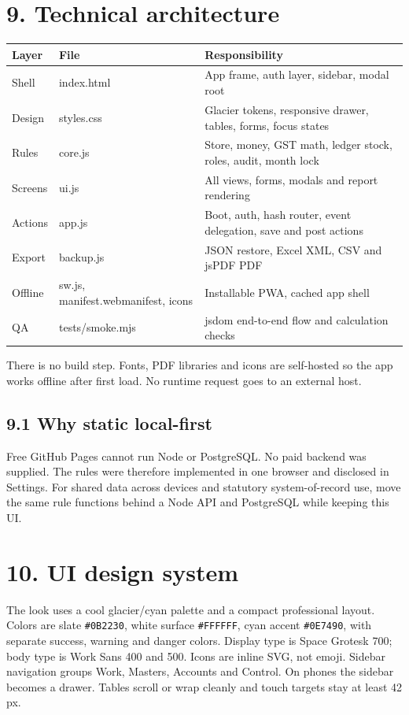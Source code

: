 \documentclass[11pt]{article}
\begin{document}
\section{9. Technical architecture}
\begin{center}\small\begin{tabularx}{\linewidth}{|*{3}{>{\raggedright\arraybackslash}X|}}
\hline
\textbf{Layer} & \textbf{File} & \textbf{Responsibility} \\
\hline
Shell & index.html & App frame, auth layer, sidebar, modal root \\
\hline
Design & styles.css & Glacier tokens, responsive drawer, tables, forms, focus states \\
\hline
Rules & core.js & Store, money, GST math, ledger stock, roles, audit, month lock \\
\hline
Screens & ui.js & All views, forms, modals and report rendering \\
\hline
Actions & app.js & Boot, auth, hash router, event delegation, save and post actions \\
\hline
Export & backup.js & JSON restore, Excel XML, CSV and jsPDF PDF \\
\hline
Offline & sw.js, manifest.webmanifest, icons & Installable PWA, cached app shell \\
\hline
QA & tests/smoke.mjs & jsdom end-to-end flow and calculation checks \\
\hline
\end{tabularx}\end{center}
There is no build step. Fonts, PDF libraries and icons are self-hosted so the app works offline after first load. No runtime request goes to an external host.
\subsection{9.1 Why static local-first}
Free GitHub Pages cannot run Node or PostgreSQL. No paid backend was supplied. The rules were therefore implemented in one browser and disclosed in Settings. For shared data across devices and statutory system-of-record use, move the same rule functions behind a Node API and PostgreSQL while keeping this UI.
\clearpage
\section{10. UI design system}
The look uses a cool glacier/cyan palette and a compact professional layout. Colors are slate \texttt{\#0B2230}, white surface \texttt{\#FFFFFF}, cyan accent \texttt{\#0E7490}, with separate success, warning and danger colors. Display type is Space Grotesk 700; body type is Work Sans 400 and 500. Icons are inline SVG, not emoji. Sidebar navigation groups Work, Masters, Accounts and Control. On phones the sidebar becomes a drawer. Tables scroll or wrap cleanly and touch targets stay at least 42 px.
\clearpage
\end{document}
